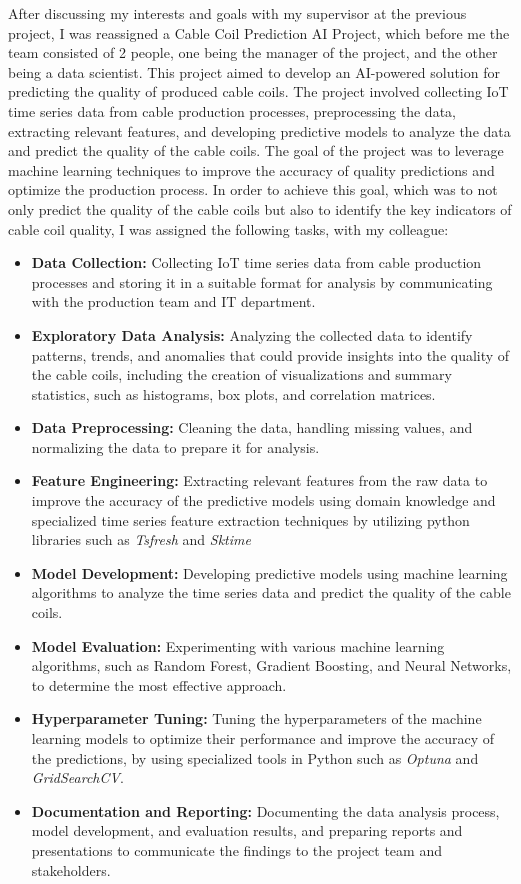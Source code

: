 After discussing my interests and goals with my supervisor at the previous
project, I was reassigned a Cable Coil Prediction AI Project, which before me the team
consisted of 2 people, one being the manager of the project, and the other
being a data scientist. This project aimed to develop an AI-powered
solution for predicting the quality of produced cable coils. The project
involved collecting IoT time series data from cable production processes,
preprocessing the data, extracting relevant features, and developing predictive
models to analyze the data and predict the quality of the cable coils. The goal
of the project was to leverage machine learning techniques to improve the
accuracy of quality predictions and optimize the production process. In order
to achieve this goal, which was to not only predict the quality of the cable
coils but also to identify the key indicators of cable coil quality, I was
assigned the following tasks, with my colleague:
\begin{itemize}
    \item \textbf{Data Collection:} Collecting IoT time series data from cable production processes and storing it in a suitable format for analysis by communicating with the production team and IT department.
    \item \textbf{Exploratory Data Analysis:} Analyzing the collected data to identify patterns, trends, and anomalies that could provide insights into the quality of the cable coils, including the creation of visualizations and summary statistics, such as histograms, box plots, and correlation matrices.
    \item \textbf{Data Preprocessing:} Cleaning the data, handling missing values, and normalizing the data to prepare it for analysis.
    \item \textbf{Feature Engineering:} Extracting relevant features from the raw data to improve the accuracy of the predictive models using domain knowledge and specialized time series feature extraction techniques by utilizing python libraries such as \emph{Tsfresh} and \emph{Sktime}
    \item \textbf{Model Development:} Developing predictive models using machine learning algorithms to analyze the time series data and predict the quality of the cable coils.
    \item \textbf{Model Evaluation:} Experimenting with various machine learning algorithms, such as Random Forest, Gradient Boosting, and Neural Networks, to determine the most effective approach.
    \item \textbf{Hyperparameter Tuning:} Tuning the hyperparameters of the machine learning models to optimize their performance and improve the accuracy of the predictions, by using specialized tools in Python such as \emph{Optuna} and \emph{GridSearchCV}.
    \item \textbf{Documentation and Reporting:} Documenting the data analysis process, model development, and evaluation results, and preparing reports and presentations to communicate the findings to the project team and stakeholders.
\end{itemize}
